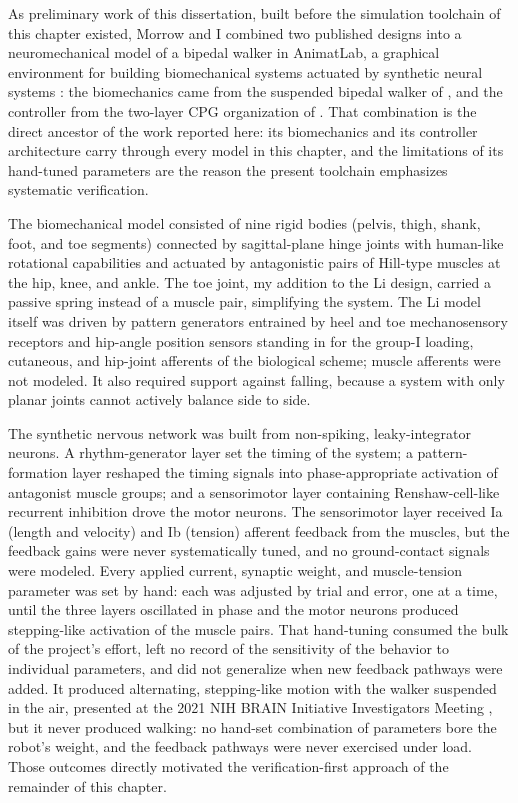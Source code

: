 As preliminary work of this dissertation, built before the simulation toolchain of this chapter existed, Morrow and I combined two published designs into a neuromechanical model of a bipedal walker in AnimatLab, a graphical environment for building biomechanical systems actuated by synthetic neural systems \citep{cofer_animatlab_2010}: the biomechanics came from the suspended bipedal walker of \citet{li_bipedal_2017}, and the controller from the two-layer CPG organization of \citet{deng_neuromechanical_2019}. That combination is the direct ancestor of the work reported here: its biomechanics and its controller architecture carry through every model in this chapter, and the limitations of its hand-tuned parameters are the reason the present toolchain emphasizes systematic verification.

The biomechanical model consisted of nine rigid bodies (pelvis, thigh, shank, foot, and toe segments) connected by sagittal-plane hinge joints with human-like rotational capabilities and actuated by antagonistic pairs of Hill-type muscles at the hip, knee, and ankle. The toe joint, my addition to the Li design, carried a passive spring instead of a muscle pair, simplifying the system. The Li model itself was driven by pattern generators entrained by heel and toe mechanosensory receptors and hip-angle position sensors standing in for the group-I loading, cutaneous, and hip-joint afferents of the biological scheme; muscle afferents were not modeled. It also required support against falling, because a system with only planar joints cannot actively balance side to side.

The synthetic nervous network was built from non-spiking, leaky-integrator neurons. A rhythm-generator layer set the timing of the system; a pattern-formation layer reshaped the timing signals into phase-appropriate activation of antagonist muscle groups; and a sensorimotor layer containing Renshaw-cell-like recurrent inhibition drove the motor neurons. The sensorimotor layer received Ia (length and velocity) and Ib (tension) afferent feedback from the muscles, but the feedback gains were never systematically tuned, and no ground-contact signals were modeled. Every applied current, synaptic weight, and muscle-tension parameter was set by hand: each was adjusted by trial and error, one at a time, until the three layers oscillated in phase and the motor neurons produced stepping-like activation of the muscle pairs. That hand-tuning consumed the bulk of the project's effort, left no record of the sensitivity of the behavior to individual parameters, and did not generalize when new feedback pathways were added. It produced alternating, stepping-like motion with the walker suspended in the air, presented at the 2021 NIH BRAIN Initiative Investigators Meeting \citep{bolenTorqueValuesArtificialKnee2021June15-17}, but it never produced walking: no hand-set combination of parameters bore the robot's weight, and the feedback pathways were never exercised under load. Those outcomes directly motivated the verification-first approach of the remainder of this chapter.

